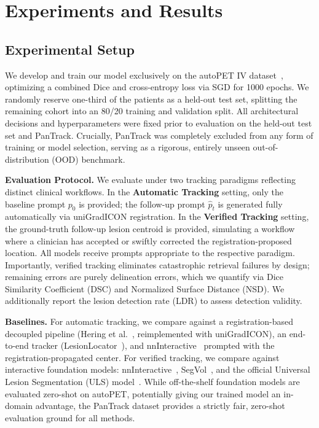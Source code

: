 \section{Experiments and Results}

\subsection{Experimental Setup}

We develop and train our model exclusively on the autoPET IV dataset~\cite{kuestner2025longitudinalct}, optimizing a combined Dice and cross-entropy loss via SGD for 1000 epochs. We randomly reserve one-third of the patients as a held-out test set, splitting the remaining cohort into an 80/20 training and validation split. All architectural decisions and hyperparameters were fixed prior to evaluation on the held-out test set and PanTrack. Crucially, PanTrack was completely excluded from any form of training or model selection, serving as a rigorous, entirely unseen out-of-distribution (OOD) benchmark. 

\noindent\textbf{Evaluation Protocol.} We evaluate under two tracking paradigms reflecting distinct clinical workflows. In the \textbf{Automatic Tracking} setting, only the baseline prompt $p_0$ is provided; the follow-up prompt $\hat{p}_t$ is generated fully automatically via uniGradICON registration. In the \textbf{Verified Tracking} setting, the ground-truth follow-up lesion centroid is provided, simulating a workflow where a clinician has accepted or swiftly corrected the registration-proposed location. All models receive prompts appropriate to the respective paradigm. Importantly, verified tracking eliminates catastrophic retrieval failures by design; remaining errors are purely delineation errors, which we quantify via Dice Similarity Coefficient (DSC) and Normalized Surface Distance (NSD). We additionally report the lesion detection rate (LDR) to assess detection validity.

\noindent\textbf{Baselines.} For automatic tracking, we compare against a registration-based decoupled pipeline (Hering et al.~\cite{hering2021whole}, reimplemented with uniGradICON), an end-to-end tracker (LesionLocator~\cite{Rokuss_2025_CVPR}), and nnInteractive~\cite{nnInteractive} prompted with the registration-propagated center. For verified tracking, we compare against interactive foundation models: nnInteractive~\cite{nnInteractive}, SegVol~\cite{du2024segvol}, and the official Universal Lesion Segmentation (ULS) model~\cite{uls_challenge}. While off-the-shelf foundation models are evaluated zero-shot on autoPET, potentially giving our trained model an in-domain advantage, the PanTrack dataset provides a strictly fair, zero-shot evaluation ground for all methods.

